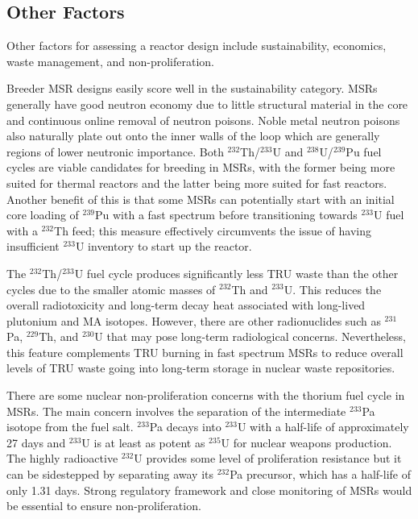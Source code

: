 \subsection{Other Factors}

Other factors for assessing a reactor design include sustainability,
economics, waste management, and non-proliferation.

Breeder \gls{MSR} designs easily score well in the sustainability category.
\glspl{MSR} generally have good neutron economy due to little structural
material in the core and continuous online removal of neutron poisons. Noble
metal neutron poisons also naturally plate out onto the inner walls of the
loop which are generally regions of lower neutronic importance. Both
$^{232}$Th/$^{233}$U and $^{238}$U/$^{239}$Pu fuel cycles are viable
candidates for breeding in \glspl{MSR}, with the former being more suited for
thermal reactors and the latter being more suited for fast reactors. Another
benefit of this is that some \glspl{MSR} can potentially start with an initial
core loading of $^{239}$Pu with a fast spectrum before transitioning towards
$^{233}$U fuel with a $^{232}$Th feed; this measure effectively circumvents
the issue of having insufficient $^{233}$U inventory to start up the reactor.

The $^{232}$Th/$^{233}$U fuel cycle produces significantly less \gls{TRU}
waste than the other cycles due to the smaller atomic masses of $^{232}$Th and
$^{233}$U. This reduces the overall radiotoxicity and long-term decay heat
associated with long-lived plutonium and \gls{MA} isotopes. However, there are
other radionuclides such as $^{231}$Pa, $^{229}$Th, and $^{230}$U that may
pose long-term radiological concerns. Nevertheless, this feature complements
\gls{TRU} burning in fast spectrum \glspl{MSR} to reduce overall levels
of \gls{TRU} waste going into long-term storage in nuclear waste repositories.

There are some nuclear non-proliferation concerns with the thorium fuel cycle
in \glspl{MSR}.
The main concern involves the separation of the intermediate $^{233}$Pa
isotope from the fuel salt. $^{233}$Pa decays into $^{233}$U with a half-life
of approximately 27 days and $^{233}$U is at least as potent as $^{235}$U for
nuclear weapons production. The highly radioactive $^{232}$U provides some
level of proliferation resistance but it can be sidestepped by
separating away its $^{232}$Pa precursor, which has a half-life of only 1.31
days. Strong regulatory framework and close monitoring of \glspl{MSR} would be
essential to ensure non-proliferation.

